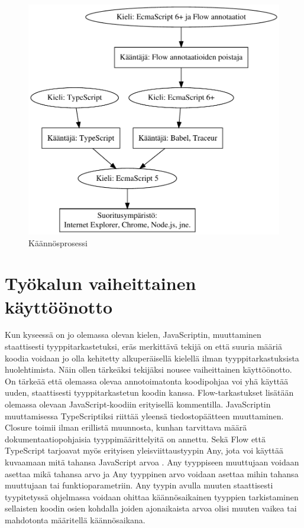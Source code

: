 \begin{figure}
\centering
\includegraphics[width=\textwidth]{images/compilation.pdf}
\caption{Käännösprosessi}
\end{figure}

\section{Työkalun vaiheittainen käyttöönotto}

Kun kyseessä on jo olemassa olevan kielen, JavaScriptin, muuttaminen
staattisesti tyyppitarkastetuksi, eräs merkittävä tekijä on että suuria
määriä koodia voidaan jo olla kehitetty alkuperäisellä kielellä ilman
tyyppitarkastuksista huolehtimista. Näin ollen tärkeäksi tekijäksi nousee
vaiheittainen käyttöönotto. On tärkeää että olemassa olevaa annotoimatonta
koodipohjaa voi yhä käyttää uuden, staattisesti tyyppitarkastetun koodin
kanssa. Flow-tarkastukset lisätään olemassa olevaan JavaScript-koodiin
erityisellä kommentilla. JavaScriptin muuttamisessa TypeScriptiksi riittää
yleensä tiedostopäätteen muuttaminen. Closure toimii ilman erillistä
muunnosta, kunhan tarvittava määrä dokumentaatiopohjaisia tyyppimäärittelyitä
on annettu. Sekä Flow että TypeScript tarjoavat myös erityisen
yleisviittaustyypin Any, jota voi käyttää kuvaamaan mitä tahansa JavaScript
arvoa \cite{TypeScriptSpec}. Any tyyppiseen muuttujaan voidaan asettaa mikä
tahansa arvo ja Any tyyppinen arvo voidaan asettaa mihin tahansa muuttujaan
tai funktioparametriin. Any tyypin avulla muuten staattisesti tyypitetyssä
ohjelmassa voidaan ohittaa käännösaikainen tyyppien tarkistaminen sellaisten
koodin osien kohdalla joiden ajonaikaista arvoa olisi muuten vaikea tai
mahdotonta määritellä käännösaikana.